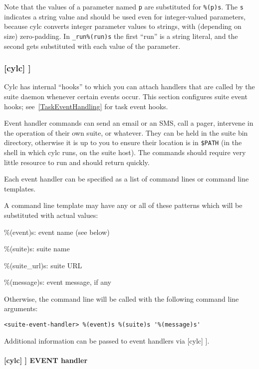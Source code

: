 Note that the values of a parameter named \lstinline=p= are substituted for
\lstinline=%(p)s=.  The \lstinline=s= indicates a string value and should
be used even for integer-valued parameters, because cylc converts integer
parameter values to strings, with (depending on size) zero-padding. In
\lstinline=_run%(run)s= the first ``run'' is a string literal, and the second
gets substituted with each value of the parameter.

\subsubsection[{[[}events{]]}]{[cylc] \textrightarrow [[events]]}
\label{SuiteEventHandling}

Cylc has internal ``hooks'' to which you can attach handlers that are
called by the suite daemon whenever certain events occur. This section
configures suite event hooks; see~\ref{TaskEventHandling} for
task event hooks.

Event handler commands can send an email or an SMS, call a pager, intervene in
the operation of their own suite, or whatever.
They can be held in the suite bin directory, otherwise it is up to you
to ensure their location is in \lstinline=$PATH= (in the shell in which
cylc runs, on the suite host). The commands should require
very little resource to run and should return quickly.

Each event handler can be specified as a list of command lines or command
line templates.

A command line template may have any or all of these patterns which will be
substituted with actual values:
\begin{myitemize}
    \item \%(event)s: event name (see below)
    \item \%(suite)s: suite name
    \item \%(suite\_url)s: suite URL
    \item \%(message)s: event message, if any
\end{myitemize}

Otherwise, the command line will be called with the following command line
arguments:
\begin{lstlisting}
<suite-event-handler> %(event)s %(suite)s '%(message)s'
\end{lstlisting}

Additional information can be passed to event handlers via
[cylc] \textrightarrow [[environment]].

\paragraph[EVENT handler]{[cylc] \textrightarrow [[events]] \textrightarrow EVENT handler}


